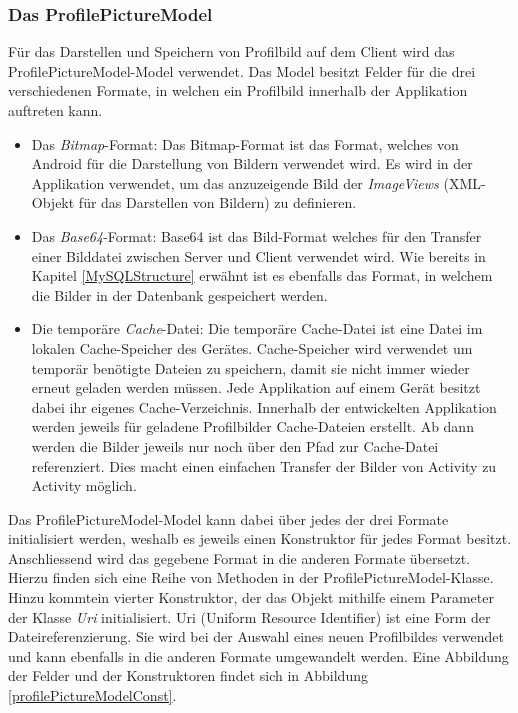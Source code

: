 \documentclass[../main.tex]{subfiles}
\begin{document}
	\subsubsection{Das ProfilePictureModel}
	Für das Darstellen und Speichern von Profilbild auf dem Client wird das ProfilePictureModel-Model verwendet. Das Model besitzt Felder für die drei verschiedenen Formate, in welchen ein Profilbild innerhalb der Applikation auftreten kann.
	
	\begin{itemize}
		\item Das \emph{Bitmap}-Format: Das Bitmap-Format ist das Format, welches von Android für die Darstellung von Bildern verwendet wird. Es wird in der Applikation verwendet, um das anzuzeigende Bild der \emph{ImageViews} (XML-Objekt für das Darstellen von Bildern) zu definieren.
		\item Das \emph{Base64}-Format: Base64 ist das Bild-Format welches für den Transfer einer Bilddatei zwischen Server und Client verwendet wird. Wie bereits in Kapitel \ref{MySQLStructure} erwähnt ist es ebenfalls das Format, in welchem die Bilder in der Datenbank gespeichert werden.
		\item Die temporäre \emph{Cache}-Datei: Die temporäre Cache-Datei ist eine Datei im lokalen Cache-Speicher des Gerätes. Cache-Speicher wird verwendet um temporär benötigte Dateien zu speichern, damit sie nicht immer wieder erneut geladen werden müssen. Jede Applikation auf einem Gerät besitzt dabei ihr eigenes Cache-Verzeichnis. Innerhalb der entwickelten Applikation werden jeweils für geladene Profilbilder Cache-Dateien erstellt. Ab dann werden die Bilder jeweils nur noch über den Pfad zur Cache-Datei referenziert. Dies macht einen einfachen Transfer der Bilder von Activity zu Activity möglich. \cite{cache}
	\end{itemize}

	Das ProfilePictureModel-Model kann dabei über jedes der drei Formate initialisiert werden, weshalb es jeweils einen Konstruktor für jedes Format besitzt. Anschliessend wird das gegebene Format in die anderen Formate übersetzt. Hierzu finden sich eine Reihe von Methoden in der ProfilePictureModel-Klasse. Hinzu kommtein vierter Konstruktor, der das Objekt mithilfe einem Parameter der Klasse \emph{Uri} initialisiert. Uri (Uniform Resource Identifier) ist eine Form der Dateireferenzierung. Sie wird bei der Auswahl eines neuen Profilbildes verwendet und kann ebenfalls in die anderen Formate umgewandelt werden. Eine Abbildung der Felder und der Konstruktoren findet sich in Abbildung \ref{profilePictureModelConst}.
	
\end{document}
